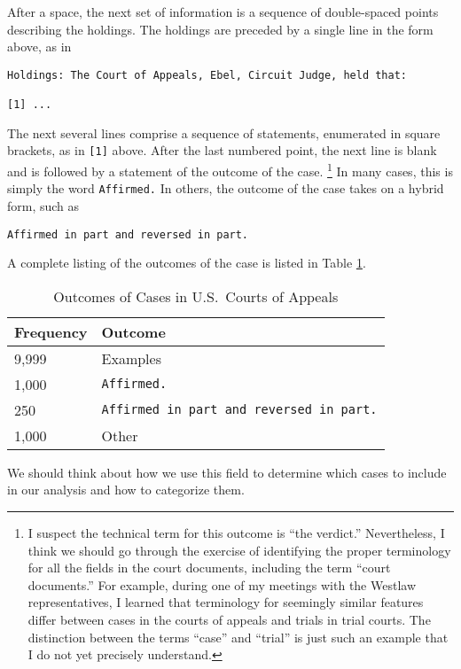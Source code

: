 \documentclass[11pt]{paper}
\begin{document}
After a space, the next set of information is a sequence of double-spaced 
points describing the holdings. 
The holdings are preceded by a single line in the form above, as in 
% 
\begin{verbatim}
Holdings: The Court of Appeals, Ebel, Circuit Judge, held that:

[1] ...
\end{verbatim}
% 
The next several lines comprise a sequence of statements, enumerated in square 
brackets, as in \texttt{[1]} above. 
After the last numbered point, the next line is blank and is followed by a 
statement of the outcome of the case.%
\footnote{I suspect the technical term for this outcome is ``the verdict.'' 
          Nevertheless, I think we should go through the exercise 
          of identifying the proper terminology for all the fields 
          in the court documents, including the term ``court documents.''
          For example, during one of my meetings with the Westlaw 
	  representatives, I learned that terminology for seemingly similar 
	  features differ between cases in the courts of appeals and trials 
	  in trial courts. 
          The distinction between the terms ``case'' and ``trial'' is just 
	  such an example that I do not yet precisely understand.
	 } 
In many cases, this is simply the word \texttt{Affirmed.}
In others, the outcome of the case takes on a hybrid form, such as
% 
\begin{verbatim}
Affirmed in part and reversed in part.
\end{verbatim}
% 
A complete listing of the outcomes of the case is listed in 
Table \ref{tab:outcome_list}. 
% 
\begin{table}[ht]
\centering
\begin{tabular}{l l}
  \hline
	Frequency 	& Outcome \\ 
  \hline
  	9,999 		& Examples \\ 
  	1,000 		& \texttt{Affirmed.} \\ 
	   250 		& \texttt{Affirmed in part and reversed in part.} \\ 
  	1,000 		& Other \\ 
   \hline
\end{tabular}
\caption{Outcomes of Cases in U.S.~Courts of Appeals} 
\label{tab:outcome_list}
\end{table}
% 
We should think about how we use this field to determine which cases to 
include in our analysis and how to categorize them. 
\end{document}
